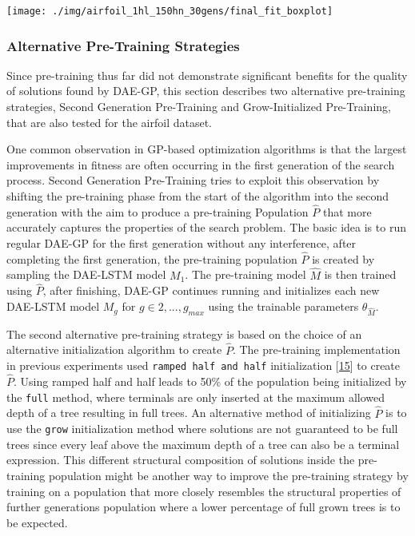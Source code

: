 \documentclass[
  11pt,
]{article}
\let\origfigure\figure
\let\endorigfigure\endfigure
\renewenvironment{figure}[1][2] {
    \expandafter\origfigure\expandafter[H]
} {
    \endorigfigure
}
\begin{document}
\begin{figure}[c]

{\centering \texttt{[image: ./img/airfoil\_1hl\_150hn\_30gens/final\_fit\_boxplot]} 

}

\caption{Fitness after 30 Generations - Airfoil - Single Hidden Layer}\label{fig:airfoil-finalFitness}
\end{figure}

\hypertarget{alternative-pre-training-strategies}{%
\subsubsection{Alternative Pre-Training Strategies}\label{alternative-pre-training-strategies}}

Since pre-training thus far did not demonstrate significant benefits for the quality of solutions found by DAE-GP, this section describes two alternative pre-training strategies, Second Generation Pre-Training and Grow-Initialized Pre-Training, that are also tested for the airfoil dataset.

One common observation in GP-based optimization algorithms is that the largest improvements in fitness are often occurring in the first generation of the search process.
Second Generation Pre-Training tries to exploit this observation by shifting the pre-training phase from the start of the algorithm into the second generation with the aim to produce a pre-training Population \(\hat{P}\) that more accurately captures the properties of the search problem.
The basic idea is to run regular DAE-GP for the first generation without any interference, after completing the first generation, the pre-training population \(\hat{P}\) is created by sampling the DAE-LSTM model \(M_1\).
The pre-training model \(\hat{M}\) is then trained using \(\hat{P}\), after finishing, DAE-GP continues running and initializes each new DAE-LSTM model \(M_g\) for \(g\in{2,...,g_{max}}\) using the trainable parameters \(\theta_{\hat{M}}\).

The second alternative pre-training strategy is based on the choice of an alternative initialization algorithm to create \(\hat{P}\).
The pre-training implementation in previous experiments used \texttt{ramped\ half\ and\ half} initialization {[}\protect\hyperlink{ref-Koza1993GeneticP}{15}{]} to create \(\hat{P}\).
Using ramped half and half leads to 50\% of the population being initialized by the \texttt{full} method, where terminals are only inserted at the maximum allowed depth of a tree resulting in full trees.
An alternative method of initializing \(\hat{P}\) is to use the \texttt{grow} initialization method where solutions are not guaranteed to be full trees since every leaf above the maximum depth of a tree can also be a terminal expression.
This different structural composition of solutions inside the pre-training population might be another way to improve the pre-training strategy by training on a population that more closely resembles the structural properties of further generations population where a lower percentage of full grown trees is to be expected.
\end{document}
